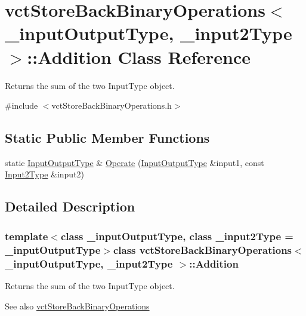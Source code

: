 \hypertarget{classvct_store_back_binary_operations_1_1_addition}{}\section{vct\+Store\+Back\+Binary\+Operations$<$ \+\_\+input\+Output\+Type, \+\_\+input2\+Type $>$\+:\+:Addition Class Reference}
\label{classvct_store_back_binary_operations_1_1_addition}


Returns the sum of the two Input\+Type object.  




{\ttfamily \#include $<$vct\+Store\+Back\+Binary\+Operations.\+h$>$}

\subsection*{Static Public Member Functions}
\begin{DoxyCompactItemize}
\item 
static \hyperlink{classvct_store_back_binary_operations_a9dc481d9e1345541dd5d833d5e5688f3}{Input\+Output\+Type} \& \hyperlink{classvct_store_back_binary_operations_1_1_addition_a4bed52bd00e9a8ea4f4af74dbe3bba7c}{Operate} (\hyperlink{classvct_store_back_binary_operations_a9dc481d9e1345541dd5d833d5e5688f3}{Input\+Output\+Type} \&input1, const \hyperlink{classvct_store_back_binary_operations_a65a7197563c794a879fb50a406e70c8f}{Input2\+Type} \&input2)
\end{DoxyCompactItemize}


\subsection{Detailed Description}
\subsubsection*{template$<$class \+\_\+input\+Output\+Type, class \+\_\+input2\+Type = \+\_\+input\+Output\+Type$>$class vct\+Store\+Back\+Binary\+Operations$<$ \+\_\+input\+Output\+Type, \+\_\+input2\+Type $>$\+::\+Addition}

Returns the sum of the two Input\+Type object. 

\begin{DoxySeeAlso}{See also}
\hyperlink{classvct_store_back_binary_operations}{vct\+Store\+Back\+Binary\+Operations} 
\end{DoxySeeAlso}


